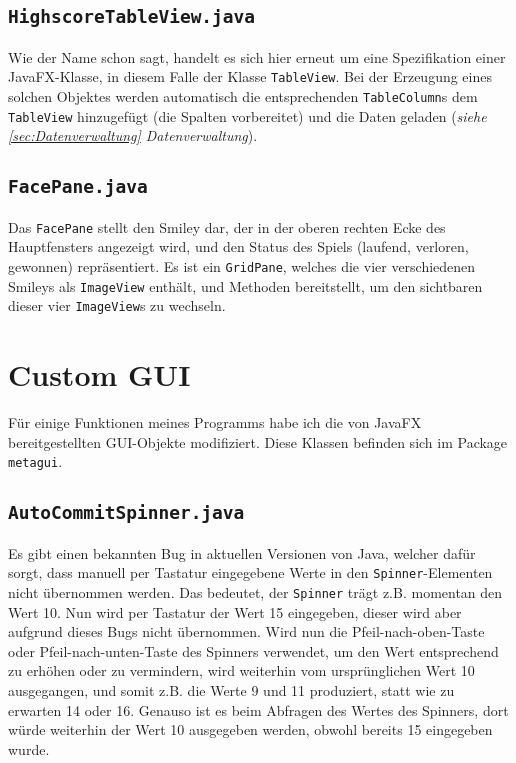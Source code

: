\documentclass[oneside,12pt]{scrartcl}
\newcommand*{\EnableHyphenationInTexttt}{\hyphenchar\font=45\relax}%
\newcommand{\class}[1]{\textcolor{Green4}{\bcode{#1}}}
\newcommand{\package}[1]{Package \npackage{#1}}
\newcommand{\npackage}[1]{\textcolor{Blue4}{\bcode{#1}}}
\newcommand{\bcode}[1]{\texttt{\EnableHyphenationInTexttt#1}}
\begin{document}
\subsection{\class{HighscoreTableView.java}}
\label{sec:HighscoreTableView}
Wie der Name schon sagt, handelt es sich hier erneut um eine Spezifikation einer JavaFX-Klasse, in diesem Falle der Klasse \class{TableView}. Bei der Erzeugung eines solchen Objektes werden automatisch die entsprechenden \class{TableColumn}s dem \class{TableView} hinzugefügt (die Spalten vorbereitet) und die Daten geladen (\textit{siehe \ref{sec:Datenverwaltung} Datenverwaltung}).

\subsection{\class{FacePane.java}}
Das \class{FacePane} stellt den Smiley dar, der in der oberen rechten Ecke des Hauptfensters angezeigt wird, und den Status des Spiels (laufend, verloren, gewonnen) repräsentiert. Es ist ein \class{GridPane}, welches die vier verschiedenen Smileys als \class{ImageView} enthält, und Methoden bereitstellt, um den sichtbaren dieser vier \class{ImageView}s zu wechseln.

\section{Custom GUI}
Für einige Funktionen meines Programms habe ich die von JavaFX bereitgestellten GUI-Objekte modifiziert. Diese Klassen befinden sich im \package{metagui}.

\subsection{\class{AutoCommitSpinner.java}}
\label{sec:AutoCommitSpinner}
Es gibt einen bekannten Bug in aktuellen Versionen von Java, welcher dafür sorgt, dass manuell per Tastatur eingegebene Werte in den \class{Spinner}-Elementen nicht übernommen werden. Das bedeutet, der \class{Spinner} trägt z.B. momentan den Wert 10. Nun wird per Tastatur der Wert 15 eingegeben, dieser wird aber aufgrund dieses Bugs nicht übernommen. Wird nun die Pfeil-nach-oben-Taste oder Pfeil-nach-unten-Taste des Spinners verwendet, um den Wert entsprechend zu erhöhen oder zu vermindern, wird weiterhin vom ursprünglichen Wert 10 ausgegangen, und somit z.B. die Werte 9 und 11 produziert, statt wie zu erwarten 14 oder 16. Genauso ist es beim Abfragen des Wertes des Spinners, dort würde weiterhin der Wert 10 ausgegeben werden, obwohl bereits 15 eingegeben wurde.
\end{document}

